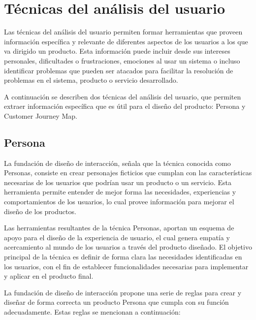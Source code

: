 
\section{Técnicas del análisis del usuario}
\label{TecnicasAnalisisCap3}

Las técnicas del análisis del usuario permiten formar herramientas que proveen información específica y relevante de diferentes aspectos de los usuarios a los que va dirigido un producto. Esta información puede incluir desde sus intereses personales, dificultades o frustraciones, emociones al usar un sistema o incluso identificar problemas que pueden ser atacados para facilitar la resolución de problemas en el sistema, producto o servicio desarrollado.

A continuación se describen dos técnicas del análisis del usuario, que permiten extraer información específica que es útil para el diseño del producto: Persona y Customer Journey Map.


\subsection{Persona}
\label{PersonaCap3}

La fundación de diseño de interacción, señala que la técnica conocida como Personas, consiste en crear personajes ficticios que cumplan con las características necesarias de los usuarios que podrían usar un producto o un servicio. Esta herramienta permite entender de mejor forma las necesidades, experiencias y comportamientos de los usuarios, lo cual provee información para mejorar el diseño de los productos.

Las herramientas resultantes de la técnica Personas, aportan un esquema de apoyo para el diseño de la experiencia de usuario, el cual genera empatía y acercamiento al mundo de los usuarios a través del producto diseñado. El objetivo principal de la técnica es definir de forma clara las necesidades identificadas en los usuarios, con el fin de establecer funcionalidades necesarias para implementar y aplicar en el producto final.

La fundación de diseño de interacción propone una serie de reglas para crear y diseñar de forma correcta un producto Persona que cumpla con su función adecuadamente. Estas reglas se mencionan a continuación:

